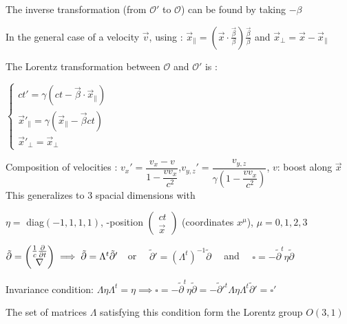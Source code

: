 \item The inverse transformation (from $\mathcal{O}'$ to $\mathcal{O}$) can be found by taking $-\beta$

\item In the general case of a velocity $\vec{v}$, using : $\vec{x}_{\parallel} = \left( \vec{x} \cdot \frac{\vec{\beta}}{\beta} \right) \frac{\vec{\beta}}{\beta}$ and  $\vec{x}_{\perp} = \vec{x} - \vec{x}_{\parallel}$


\item The Lorentz transformation between $\mathcal{O}$ and $\mathcal{O}'$ is : 
\item $\begin{cases}
ct' = \gamma(ct- \vec{\beta} \cdot \vec{x}_\parallel) \\
\vec{x}'_{\parallel} = \gamma(\vec{x}_\parallel- \vec{\beta} c t)\\
\vec{x}'_{\perp} = \vec{x}_\perp
\end{cases}$
	
\item Composition of velocities : %
$v_x' = \dfrac{v_x - v}{1 - \dfrac{v v_x}{c^2}}$,\quad $v_{y,z}' = \dfrac{v_{y,z}}{\gamma(1 - \dfrac{v v_x}{c^2})}$, $v$: boost along $\vec{x}$
\squishend
{}
This generalizes to 3 spacial dimensions with
\squishlist
\item $\eta =$ diag$(-1,1,1,1)$, -position $ \begin{pmatrix}
    ct\\
\vec{x}
\end{pmatrix}$ (coordinates $x^{\mu}$), $\mu = 0,1,2,3 $
\item 
$\tilde\partial = \begin{pmatrix}
    \frac{1}{c}\frac{\partial }{\partial t} \\
    \nabla 
\end{pmatrix}
\implies \tilde\partial = \Lambda^t\tilde\partial' \quad $or $ \quad \tilde\partial' = (\Lambda^t)^{-1}\tilde\partial \quad $ and $ \quad  \square =-\tilde\partial^t\eta\tilde\partial$

\item Invariance condition: $\Lambda\eta\Lambda^t= \eta \implies \square =-\tilde\partial^t\eta\tilde\partial =-\tilde\partial'^t\Lambda\eta\Lambda^t\tilde\partial'= \square' $ 
\item The set of matrices $\Lambda$ satisfying this condition form the Lorentz group $O(3,1)$

